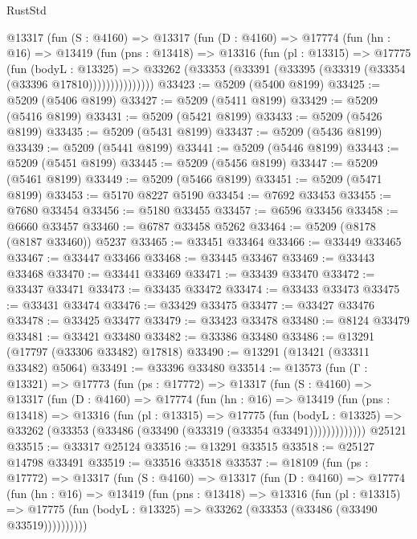 \begin{lexlean}{RustStd}
\begin{coremodule}
        @13317
          (fun (S : @4160) =>
          @13317
            (fun (D : @4160) =>
            @17774
              (fun (hn : @16) =>
              @13419
                (fun (pns : @13418) =>
                @13316
                  (fun (pl : @13315) =>
                  @17775
                    (fun (bodyL : @13325) =>
                    @33262 (@33353 (@33391 (@33395 (@33319 (@33354 (@33396 @17810)))))))))))))))
@33423 := @5209 (@5400 @8199)
@33425 := @5209 (@5406 @8199)
@33427 := @5209 (@5411 @8199)
@33429 := @5209 (@5416 @8199)
@33431 := @5209 (@5421 @8199)
@33433 := @5209 (@5426 @8199)
@33435 := @5209 (@5431 @8199)
@33437 := @5209 (@5436 @8199)
@33439 := @5209 (@5441 @8199)
@33441 := @5209 (@5446 @8199)
@33443 := @5209 (@5451 @8199)
@33445 := @5209 (@5456 @8199)
@33447 := @5209 (@5461 @8199)
@33449 := @5209 (@5466 @8199)
@33451 := @5209 (@5471 @8199)
@33453 := @5170 @8227 @5190
@33454 := @7692 @33453
@33455 := @7680 @33454
@33456 := @5180 @33455
@33457 := @6596 @33456
@33458 := @6660 @33457
@33460 := @6787 @33458 @5262
@33464 := @5209 (@8178 (@8187 @33460)) @5237
@33465 := @33451 @33464
@33466 := @33449 @33465
@33467 := @33447 @33466
@33468 := @33445 @33467
@33469 := @33443 @33468
@33470 := @33441 @33469
@33471 := @33439 @33470
@33472 := @33437 @33471
@33473 := @33435 @33472
@33474 := @33433 @33473
@33475 := @33431 @33474
@33476 := @33429 @33475
@33477 := @33427 @33476
@33478 := @33425 @33477
@33479 := @33423 @33478
@33480 := @8124 @33479
@33481 := @33421 @33480
@33482 := @33386 @33480
@33486 := @13291 (@17797 (@33306 @33482) @17818)
@33490 := @13291 (@13421 (@33311 @33482) @5064)
@33491 := @33396 @33480
@33514 := @13573
    (fun (Γ : @13321) =>
    @17773
      (fun (ps : @17772) =>
      @13317
        (fun (S : @4160) =>
        @13317
          (fun (D : @4160) =>
          @17774
            (fun (hn : @16) =>
            @13419
              (fun (pns : @13418) =>
              @13316
                (fun (pl : @13315) =>
                @17775
                  (fun (bodyL : @13325) =>
                  @33262 (@33353 (@33486 (@33490 (@33319 (@33354 @33491)))))))))))))
    @25121
@33515 := @33317 @25124
@33516 := @13291 @33515
@33518 := @25127 @14798 @33491
@33519 := @33516 @33518
@33537 := @18109
    (fun (ps : @17772) =>
    @13317
      (fun (S : @4160) =>
      @13317
        (fun (D : @4160) =>
        @17774
          (fun (hn : @16) =>
          @13419
            (fun (pns : @13418) =>
            @13316
              (fun (pl : @13315) =>
              @17775 (fun (bodyL : @13325) => @33262 (@33353 (@33486 (@33490 @33519))))))))))

\end{coremodule}
\end{lexlean}
